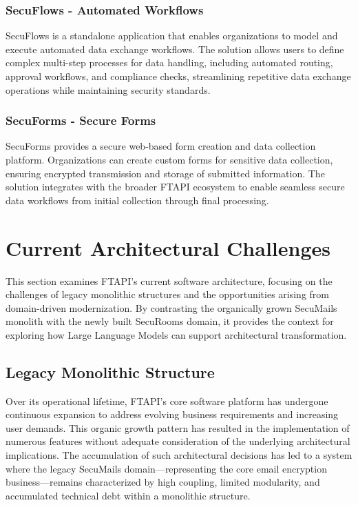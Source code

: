 \subsubsection{SecuFlows - Automated Workflows}
SecuFlows is a standalone application that enables organizations to model and execute automated data exchange workflows. The solution allows users to define complex multi-step processes for data handling, including automated routing, approval workflows, and compliance checks, streamlining repetitive data exchange operations while maintaining security standards.

\subsubsection{SecuForms - Secure Forms}
SecuForms provides a secure web-based form creation and data collection platform. Organizations can create custom forms for sensitive data collection, ensuring encrypted transmission and storage of submitted information. The solution integrates with the broader FTAPI ecosystem to enable seamless secure data workflows from initial collection through final processing.

\section{Current Architectural Challenges}

This section examines FTAPI's current software architecture, focusing on the challenges of legacy monolithic structures and the opportunities arising from domain-driven modernization. By contrasting the organically grown SecuMails monolith with the newly built SecuRooms domain, it provides the context for exploring how Large Language Models can support architectural transformation.

\subsection{Legacy Monolithic Structure}
Over its operational lifetime, FTAPI's core software platform has undergone continuous expansion to address evolving business requirements and increasing user demands. This organic growth pattern has resulted in the implementation of numerous features without adequate consideration of the underlying architectural implications. The accumulation of such architectural decisions has led to a system where the legacy SecuMails domain—representing the core email encryption business—remains characterized by high coupling, limited modularity, and accumulated technical debt within a monolithic structure.


